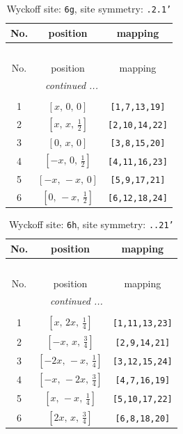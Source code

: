 \documentclass[fleqn,8pt]{jsarticle}
\begin{document}
\renewcommand{\arraystretch}{1.2}
\begin{longtable}{ccc}
\caption{Wyckoff site: {\tt 6g}, site symmetry: {\tt .2.1'}}
 \\
 \hline \hline
No. & position & mapping \\ \hline \endfirsthead

\multicolumn{2}{l}{\tablename\ \thetable{}} \\
 \hline \hline
No. & position & mapping \\ \hline \endhead

 \hline \hline
\multicolumn{2}{r}{\footnotesize\it continued ...} \\ \endfoot

 \hline \hline
\multicolumn{2}{r}{} \\ \endlastfoot

1 & $\left[ x,\, 0,\, 0 \right]$ & {\tt [1,7,13,19]} \\ \hline
2 & $\left[ x,\, x,\, \frac{1}{2} \right]$ & {\tt [2,10,14,22]} \\ \hline
3 & $\left[ 0,\, x,\, 0 \right]$ & {\tt [3,8,15,20]} \\ \hline
4 & $\left[ - x,\, 0,\, \frac{1}{2} \right]$ & {\tt [4,11,16,23]} \\ \hline
5 & $\left[ - x,\, - x,\, 0 \right]$ & {\tt [5,9,17,21]} \\ \hline
6 & $\left[ 0,\, - x,\, \frac{1}{2} \right]$ & {\tt [6,12,18,24]} \\
\end{longtable}
\renewcommand{\arraystretch}{1.2}
\begin{longtable}{ccc}
\caption{Wyckoff site: {\tt 6h}, site symmetry: {\tt ..21'}}
 \\
 \hline \hline
No. & position & mapping \\ \hline \endfirsthead

\multicolumn{2}{l}{\tablename\ \thetable{}} \\
 \hline \hline
No. & position & mapping \\ \hline \endhead

 \hline \hline
\multicolumn{2}{r}{\footnotesize\it continued ...} \\ \endfoot

 \hline \hline
\multicolumn{2}{r}{} \\ \endlastfoot

1 & $\left[ x,\, 2 x,\, \frac{1}{4} \right]$ & {\tt [1,11,13,23]} \\ \hline
2 & $\left[ - x,\, x,\, \frac{3}{4} \right]$ & {\tt [2,9,14,21]} \\ \hline
3 & $\left[ - 2 x,\, - x,\, \frac{1}{4} \right]$ & {\tt [3,12,15,24]} \\ \hline
4 & $\left[ - x,\, - 2 x,\, \frac{3}{4} \right]$ & {\tt [4,7,16,19]} \\ \hline
5 & $\left[ x,\, - x,\, \frac{1}{4} \right]$ & {\tt [5,10,17,22]} \\ \hline
6 & $\left[ 2 x,\, x,\, \frac{3}{4} \right]$ & {\tt [6,8,18,20]} \\
\end{longtable}
\end{document}
